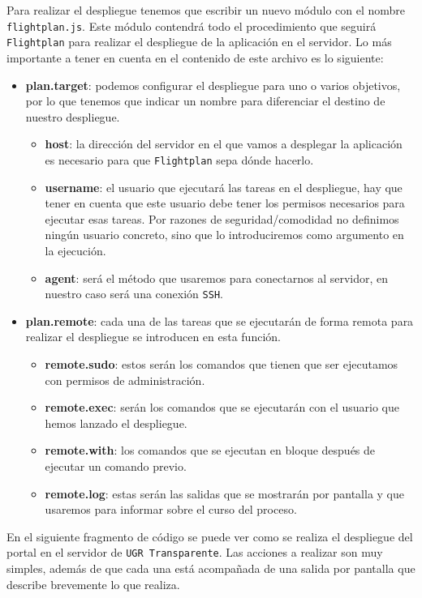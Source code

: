 \bigskip

Para realizar el despliegue tenemos que escribir un nuevo módulo con el nombre {\tt flightplan.js}. Este módulo contendrá todo el procedimiento que seguirá {\tt Flightplan} para realizar el despliegue de la aplicación en el servidor. Lo más importante a tener en cuenta en el contenido de este archivo es lo siguiente:

\begin{itemize}
	\item \textbf{plan.target}: podemos configurar el despliegue para uno o varios objetivos, por lo que tenemos que indicar un nombre para diferenciar el destino de nuestro despliegue.
	\begin{itemize}
		\item \textbf{host}: la dirección del servidor en el que vamos a desplegar la aplicación es necesario para que {\tt Flightplan} sepa dónde hacerlo.
		\newpage
		\item \textbf{username}: el usuario que ejecutará las tareas en el despliegue, hay que tener en cuenta que este usuario debe tener los permisos necesarios para ejecutar esas tareas. Por razones de seguridad/comodidad no definimos ningún usuario concreto, sino que lo introduciremos como argumento en la ejecución.
		\item \textbf{agent}: será el método que usaremos para conectarnos al servidor, en nuestro caso será una conexión {\tt SSH}.
	\end{itemize}
	\item \textbf{plan.remote}: cada una de las tareas que se ejecutarán de forma remota para realizar el despliegue se introducen en esta función.
	\begin{itemize}
		\item \textbf{remote.sudo}: estos serán los comandos que tienen que ser ejecutamos con permisos de administración.
		\item \textbf{remote.exec}: serán los comandos que se ejecutarán con el usuario que hemos lanzado el despliegue.
		\item \textbf{remote.with}: los comandos que se ejecutan en bloque después de ejecutar un comando previo.
		\item \textbf{remote.log}: estas serán las salidas que se mostrarán por pantalla y que usaremos para informar sobre el curso del proceso.
	\end{itemize}	
\end{itemize}

En el siguiente fragmento de código se puede ver como se realiza el despliegue del portal en el servidor de {\tt UGR Transparente}. Las acciones a realizar son muy simples, además de que cada una está acompañada de una salida por pantalla que describe brevemente lo que realiza.

